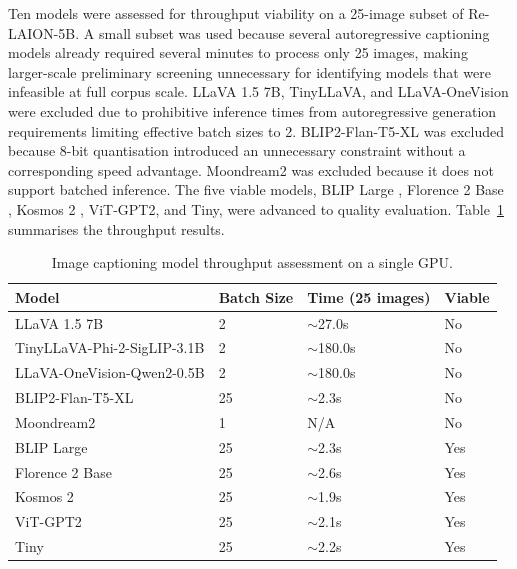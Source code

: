 Ten models were assessed for throughput viability on a 25-image subset of Re-LAION-5B. A small subset was used because several autoregressive captioning models already required several minutes to process only 25 images, making larger-scale preliminary screening unnecessary for identifying models that were infeasible at full corpus scale. LLaVA 1.5 7B, TinyLLaVA, and LLaVA-OneVision were excluded due to prohibitive inference times from autoregressive generation requirements limiting effective batch sizes to 2. BLIP2-Flan-T5-XL was excluded because 8-bit quantisation introduced an unnecessary constraint without a corresponding speed advantage. Moondream2 was excluded because it does not support batched inference. The five viable models, BLIP Large \cite{Li_2022_BLIP}, Florence 2 Base \cite{Xiao_2024_Florence2}, Kosmos 2 \cite{Peng_2023_Kosmos2}, ViT-GPT2, and Tiny, were advanced to quality evaluation. Table~\ref{tab:caption_viability} summarises the throughput results.

\begin{table}[ht]
	\centering
	\footnotesize
	\begin{tabular}{llll}
		\hline
		\textbf{Model}                             & \textbf{Batch Size} & \textbf{Time (25 images)} &
		\textbf{Viable}                                                                                    \\
		\hline
		LLaVA 1.5 7B \cite{Liu_2023_LLaVA}         & 2                   & $\sim$27.0s               & No  \\
		TinyLLaVA-Phi-2-SigLIP-3.1B                & 2                   & $\sim$180.0s              & No  \\
		LLaVA-OneVision-Qwen2-0.5B                 & 2                   & $\sim$180.0s              & No  \\
		BLIP2-Flan-T5-XL \cite{Li_2023_BLIP2}      & 25                  & $\sim$2.3s                & No  \\
		Moondream2                                 & 1                   & N/A                       & No  \\
		BLIP Large \cite{Li_2022_BLIP}             & 25                  & $\sim$2.3s                & Yes \\
		Florence 2 Base \cite{Xiao_2024_Florence2} & 25                  & $\sim$2.6s                & Yes \\
		Kosmos 2 \cite{Peng_2023_Kosmos2}          & 25                  & $\sim$1.9s                & Yes \\
		ViT-GPT2                                   & 25                  & $\sim$2.1s                & Yes \\
		Tiny                                       & 25                  & $\sim$2.2s                & Yes \\
		\hline
	\end{tabular}
	\caption{Image captioning model throughput assessment on a single GPU.}
	\label{tab:caption_viability}
\end{table}

